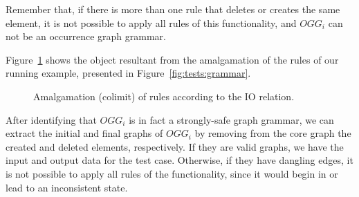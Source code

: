 Remember that, if there is more than one rule that deletes or creates the same element, it is not possible to apply all rules of this functionality, and $OGG_i$ can not be an occurrence graph grammar.

\begin{example}\label{ex:amalgamation} Figure~\ref{fig:tests:colimit} shows the object resultant from the amalgamation of the rules of our running example, presented in Figure~\ref{fig:tests:grammar}.

\begin{figure}[!ht]
  \centering
  \caption{Amalgamation (colimit) of rules according to the IO relation.}\label{fig:tests:colimit}
\end{figure}

\end{example}

After identifying that $OGG_i$ is in fact a strongly-safe graph grammar, we can extract the initial and final graphs of $OGG_i$ by removing from the core graph the created and deleted elements, respectively. If they are valid graphs, we have the input and output data for the test case. Otherwise, if they have dangling edges, it is not possible to apply all rules of the functionality, since it would begin in or lead to an inconsistent state.

